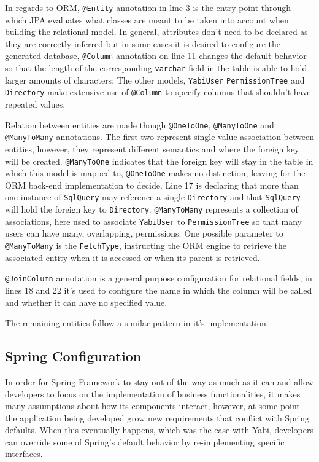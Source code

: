 In regards to \gls{ORM}, \texttt{@Entity} annotation in line 3 is the entry-point through which \gls{JPA} evaluates what classes are meant to be taken into account when building the relational model.
In general, attributes don't need to be declared as they are correctly inferred but in some cases it is desired to configure the generated database, \texttt{@Column} annotation on line 11 changes the default behavior so that the length of the corresponding \texttt{varchar} field in the table is able to hold larger amounts of characters; The other models, \texttt{YabiUser} \texttt{PermissionTree} and \texttt{Directory} make extensive use of \texttt{@Column} to specify columns that shouldn't have repeated values.

Relation between entities are made though \texttt{@OneToOne}, \texttt{@ManyToOne} and \texttt{@ManyToMany} annotations.
The first two represent single value association between entities, however, they represent different semantics and where the foreign key will be created.
\texttt{@ManyToOne} indicates that the foreign key will stay in the table in which this model is mapped to, \texttt{@OneToOne} makes no distinction, leaving for the \gls{ORM} back-end implementation to decide.
Line 17 is declaring that more than one instance of \texttt{SqlQuery} may reference a single \texttt{Directory} and that \texttt{SqlQuery} will hold the foreign key to \texttt{Directory}.
\texttt{@ManyToMany} represents a collection of associations, here used to associate \texttt{YabiUser} to \texttt{PermissionTree} so that many users can have many, overlapping, permissions. One possible parameter to \texttt{@ManyToMany} is the \texttt{FetchType}, instructing the \gls{ORM} engine to retrieve the associated entity when it is accessed or when its parent is retrieved.

\texttt{@JoinColumn} annotation is a general purpose configuration for relational fields, in lines 18 and 22 it's used to configure the name in which the column will be called and whether it can have no specified value.



The remaining entities follow a similar pattern in it's implementation.

\subsection{Spring Configuration}\label{s:config}
In order for Spring Framework to stay out of the way as much as it can and allow developers to focus on the implementation of business functionalities, it makes many assumptions about how its components interact, however, at some point the application being developed grow new requirements that conflict with Spring defaults. When this eventually happens, which was the case with \gls{Yabi}, developers can override some of Spring's default behavior by re-implementing specific interfaces.

